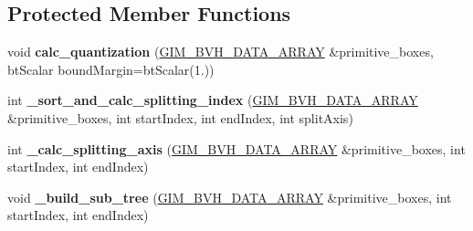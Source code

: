 \subsection*{Protected Member Functions}
\begin{DoxyCompactItemize}
\item 
\hypertarget{classbt_quantized_bvh_tree_a9cefb0a2a99cc31977f1e4caeec742b0}{void {\bfseries calc\+\_\+quantization} (\hyperlink{class_g_i_m___b_v_h___d_a_t_a___a_r_r_a_y}{G\+I\+M\+\_\+\+B\+V\+H\+\_\+\+D\+A\+T\+A\+\_\+\+A\+R\+R\+A\+Y} \&primitive\+\_\+boxes, bt\+Scalar bound\+Margin=bt\+Scalar(1.))}\label{classbt_quantized_bvh_tree_a9cefb0a2a99cc31977f1e4caeec742b0}

\item 
\hypertarget{classbt_quantized_bvh_tree_ab895904dbd5883d64f8ff88f9173ccf6}{int {\bfseries \+\_\+sort\+\_\+and\+\_\+calc\+\_\+splitting\+\_\+index} (\hyperlink{class_g_i_m___b_v_h___d_a_t_a___a_r_r_a_y}{G\+I\+M\+\_\+\+B\+V\+H\+\_\+\+D\+A\+T\+A\+\_\+\+A\+R\+R\+A\+Y} \&primitive\+\_\+boxes, int start\+Index, int end\+Index, int split\+Axis)}\label{classbt_quantized_bvh_tree_ab895904dbd5883d64f8ff88f9173ccf6}

\item 
\hypertarget{classbt_quantized_bvh_tree_ac6044782124c9990682482d51313cb24}{int {\bfseries \+\_\+calc\+\_\+splitting\+\_\+axis} (\hyperlink{class_g_i_m___b_v_h___d_a_t_a___a_r_r_a_y}{G\+I\+M\+\_\+\+B\+V\+H\+\_\+\+D\+A\+T\+A\+\_\+\+A\+R\+R\+A\+Y} \&primitive\+\_\+boxes, int start\+Index, int end\+Index)}\label{classbt_quantized_bvh_tree_ac6044782124c9990682482d51313cb24}

\item 
\hypertarget{classbt_quantized_bvh_tree_a815e8aeaa478e42b1a34bc256a95a26d}{void {\bfseries \+\_\+build\+\_\+sub\+\_\+tree} (\hyperlink{class_g_i_m___b_v_h___d_a_t_a___a_r_r_a_y}{G\+I\+M\+\_\+\+B\+V\+H\+\_\+\+D\+A\+T\+A\+\_\+\+A\+R\+R\+A\+Y} \&primitive\+\_\+boxes, int start\+Index, int end\+Index)}\label{classbt_quantized_bvh_tree_a815e8aeaa478e42b1a34bc256a95a26d}

\end{DoxyCompactItemize}
